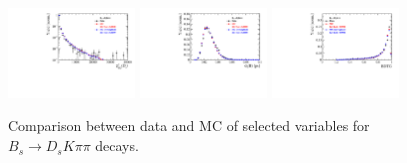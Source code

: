\begin{figure}[h]
\includegraphics[height=!,width=0.3\textwidth]{figs/dataVsMC/signal_final/combined/Ds2all_Ds_FDCHI2_ORIVX.pdf}
\includegraphics[height=!,width=0.3\textwidth]{figs/dataVsMC/signal_final/combined/Ds2all_Bs_BsDTF_TAUERR.pdf}
\includegraphics[height=!,width=0.3\textwidth]{figs/dataVsMC/signal_final/combined/Ds2all_BDTG_response.pdf}

%
%
%
%

\caption{\footnotesize Comparison between data and MC of  selected variables for $B_s\to D_sK\pi\pi$ decays.}
\label{fig:}
\end{figure}
%
%

